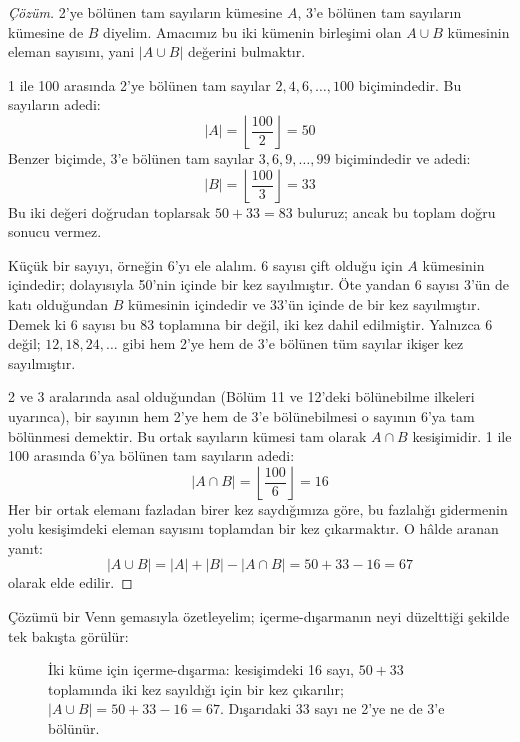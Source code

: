 \begin{proof}[Çözüm]
2'ye bölünen tam sayıların kümesine $A$, 3'e bölünen tam sayıların kümesine
de $B$ diyelim. Amacımız bu iki kümenin birleşimi olan $A \cup B$ kümesinin eleman
sayısını, yani $|A \cup B|$ değerini bulmaktır.

1 ile 100 arasında 2'ye bölünen tam sayılar $2, 4, 6, \dots, 100$ biçimindedir. Bu
sayıların adedi: \[ |A| = \left\lfloor \frac{100}{2} \right\rfloor = 50 \] Benzer
biçimde, 3'e bölünen tam sayılar $3, 6, 9, \dots, 99$ biçimindedir ve adedi: \[ |B|
= \left\lfloor \frac{100}{3} \right\rfloor = 33 \] Bu iki değeri doğrudan toplarsak
$50 + 33 = 83$ buluruz; ancak bu toplam doğru sonucu vermez.

Küçük bir sayıyı, örneğin 6'yı ele alalım. 6 sayısı çift olduğu için $A$ kümesinin
içindedir; dolayısıyla 50'nin içinde bir kez sayılmıştır. Öte yandan 6 sayısı
3'ün de katı olduğundan $B$ kümesinin içindedir ve 33'ün içinde de bir kez
sayılmıştır. Demek ki 6 sayısı bu 83 toplamına bir değil, iki kez dahil
edilmiştir. Yalnızca 6 değil; $12, 18, 24, \dots$ gibi hem 2'ye hem de 3'e bölünen
tüm sayılar ikişer kez sayılmıştır.

2 ve 3 aralarında asal olduğundan (Bölüm 11 ve 12'deki bölünebilme ilkeleri
uyarınca), bir sayının hem 2'ye hem de 3'e bölünebilmesi o sayının 6'ya tam
bölünmesi demektir. Bu ortak sayıların kümesi tam olarak $A \cap B$ kesişimidir.
1 ile 100 arasında 6'ya bölünen tam sayıların adedi: \[ |A \cap B| = \left\lfloor
\frac{100}{6} \right\rfloor = 16 \] Her bir ortak elemanı fazladan birer kez
saydığımıza göre, bu fazlalığı gidermenin yolu kesişimdeki eleman sayısını
toplamdan bir kez çıkarmaktır. O hâlde aranan yanıt: \[ |A \cup B| = |A| + |B| -
|A \cap B| = 50 + 33 - 16 = 67 \] olarak elde edilir.
\end{proof}

Çözümü bir Venn şemasıyla özetleyelim; içerme-dışarmanın neyi düzelttiği
şekilde tek bakışta görülür:

\begin{figure}[h]
\centering
{}
\caption{İki küme için içerme-dışarma: kesişimdeki 16 sayı, $50 + 33$ toplamında
iki kez sayıldığı için bir kez çıkarılır; $|A \cup B| = 50 + 33 - 16 = 67$.
Dışarıdaki 33 sayı ne 2'ye ne de 3'e bölünür.}
\end{figure}

